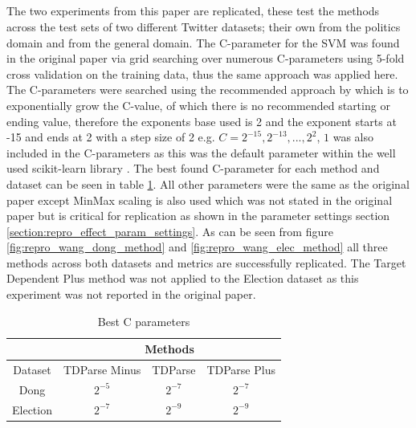 \subsection{\cite{repro_wang_2017}}
The two experiments from this paper are replicated, these test the methods across the test sets of two different Twitter datasets; their own from the politics domain and \citet{repro_dong_2014} from the general domain. The C-parameter for the SVM was found in the original paper via grid searching over numerous C-parameters using 5-fold cross validation on the training data, thus the same approach was applied here. The C-parameters were searched using the recommended approach by \citet{repro_hsu_2003} which is to exponentially grow the C-value, of which there is no recommended starting or ending value, therefore the exponents base used is 2 and the exponent starts at -15 and ends at 2 with a step size of 2 e.g. $C = 2^{-15}, 2^{-13},..., 2^2$, $1$ was also included in the C-parameters as this was the default parameter within the well used scikit-learn library \citep{repro_scikit_2011}. The best found C-parameter for each method and dataset can be seen in table \ref{table:repro_rep_wang_c}. All other parameters were the same as the original paper except MinMax scaling is also used which was not stated in the original paper but is critical for replication as shown in the parameter settings section \ref{section:repro_effect_param_settings}. As can be seen from figure \ref{fig:repro_wang_dong_method} and \ref{fig:repro_wang_elec_method} all three methods across both datasets and metrics are successfully replicated. The Target Dependent Plus method was not applied to the Election dataset as this experiment was not reported in the original paper.

\begin{table}[]
    \centering
    \begin{tabular}{|c|c|c|c|}
        \hline
         & \multicolumn{3}{|c|}{Methods} \\
        \hline
        Dataset & TDParse Minus & TDParse & TDParse Plus \\
        \hline
        Dong & $2^{-5}$ & $2^{-7}$ & $2^{-7}$ \\
        \hline
        Election & $2^{-7}$ & $2^{-9}$ & $2^{-9}$ \\
        \hline
    \end{tabular}
    \caption{Best C parameters}
    \label{table:repro_rep_wang_c}
\end{table}

